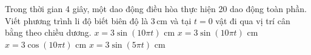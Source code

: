\begin{ex}
Trong thời gian 4 giây, một dao động điều hòa thực hiện 20 dao động toàn phần. Viết phương trình li độ biết biên độ là $3\,\text{cm}$ và tại $t = 0$ vật đi qua vị trí cân bằng theo chiều dương.
\choice
{$x = 3\sin(10\pi t)$ cm}
{\True $x = 3\sin(10\pi t)$ cm}
{$x = 3\cos(10\pi t)$ cm}
{$x = 3\sin(5\pi t)$ cm}
\end{ex}
